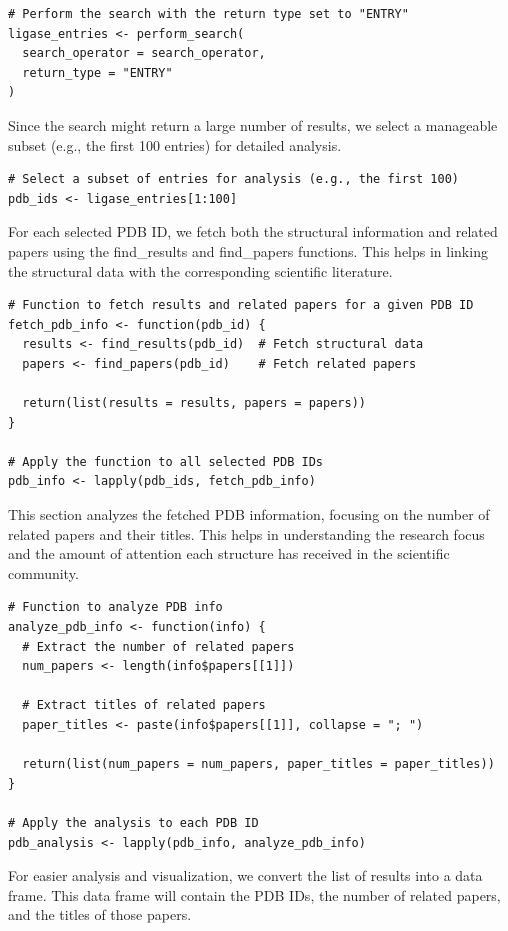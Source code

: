 \begin{verbatim}
# Perform the search with the return type set to "ENTRY"
ligase_entries <- perform_search(
  search_operator = search_operator,
  return_type = "ENTRY"
)
\end{verbatim}

Since the search might return a large number of results, we select a manageable subset (e.g., the first 100 entries) for detailed analysis.

\begin{verbatim}
# Select a subset of entries for analysis (e.g., the first 100)
pdb_ids <- ligase_entries[1:100]
\end{verbatim}

For each selected PDB ID, we fetch both the structural information and related papers using the find\_results and find\_papers functions. This helps in linking the structural data with the corresponding scientific literature.

\begin{verbatim}
# Function to fetch results and related papers for a given PDB ID
fetch_pdb_info <- function(pdb_id) {
  results <- find_results(pdb_id)  # Fetch structural data
  papers <- find_papers(pdb_id)    # Fetch related papers

  return(list(results = results, papers = papers))
}

# Apply the function to all selected PDB IDs
pdb_info <- lapply(pdb_ids, fetch_pdb_info)
\end{verbatim}

This section analyzes the fetched PDB information, focusing on the number of related papers and their titles. This helps in understanding the research focus and the amount of attention each structure has received in the scientific community.

\begin{verbatim}
# Function to analyze PDB info
analyze_pdb_info <- function(info) {
  # Extract the number of related papers
  num_papers <- length(info$papers[[1]])

  # Extract titles of related papers
  paper_titles <- paste(info$papers[[1]], collapse = "; ")

  return(list(num_papers = num_papers, paper_titles = paper_titles))
}

# Apply the analysis to each PDB ID
pdb_analysis <- lapply(pdb_info, analyze_pdb_info)
\end{verbatim}

For easier analysis and visualization, we convert the list of results into a data frame. This data frame will contain the PDB IDs, the number of related papers, and the titles of those papers.

